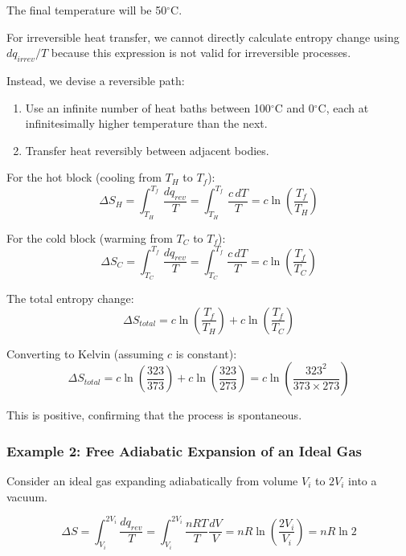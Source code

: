 \documentclass{article}
\theoremstyle{definition}
\begin{document}
The final temperature will be 50$^\circ$C.

For irreversible heat transfer, we cannot directly calculate entropy change using $dq_{irrev}/T$ because this expression is not valid for irreversible processes.

Instead, we devise a reversible path:
\begin{enumerate}
    \item Use an infinite number of heat baths between 100$^\circ$C and 0$^\circ$C, each at infinitesimally higher temperature than the next.
    \item Transfer heat reversibly between adjacent bodies.
\end{enumerate}

For the hot block (cooling from $T_H$ to $T_f$):
\begin{equation}
\Delta S_H = \int_{T_H}^{T_f} \frac{dq_{rev}}{T} = \int_{T_H}^{T_f} \frac{c \, dT}{T} = c \ln\left(\frac{T_f}{T_H}\right)
\end{equation}

For the cold block (warming from $T_C$ to $T_f$):
\begin{equation}
\Delta S_C = \int_{T_C}^{T_f} \frac{dq_{rev}}{T} = \int_{T_C}^{T_f} \frac{c \, dT}{T} = c \ln\left(\frac{T_f}{T_C}\right)
\end{equation}

The total entropy change:
\begin{equation}
\Delta S_{total} = c \ln\left(\frac{T_f}{T_H}\right) + c \ln\left(\frac{T_f}{T_C}\right)
\end{equation}

Converting to Kelvin (assuming $c$ is constant):
\begin{equation}
\Delta S_{total} = c \ln\left(\frac{323}{373}\right) + c \ln\left(\frac{323}{273}\right) = c \ln\left(\frac{323^2}{373 \times 273}\right)
\end{equation}

This is positive, confirming that the process is spontaneous.

\subsubsection{Example 2: Free Adiabatic Expansion of an Ideal Gas}

Consider an ideal gas expanding adiabatically from volume $V_i$ to $2V_i$ into a vacuum.

\begin{equation}
\Delta S = \int_{V_i}^{2V_i} \frac{dq_{rev}}{T} = \int_{V_i}^{2V_i} \frac{nRT}{T} \frac{dV}{V} = nR \ln\left(\frac{2V_i}{V_i}\right) = nR \ln 2
\end{equation}
\end{document}

